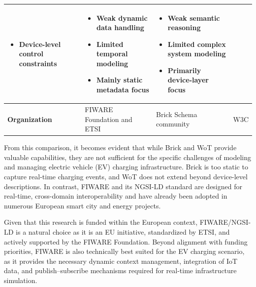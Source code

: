 \begin{table}[htb]
\begin{tabular}{|>{\raggedright\arraybackslash}p{2.8cm}|>{\raggedright\arraybackslash}p{4cm}|>{\raggedright\arraybackslash}p{4cm}|>{\raggedright\arraybackslash}p{4cm}|}
\begin{itemize}[leftmargin=*,nosep,after=\strut]
\item Device-level control constraints
\end{itemize} & 
\begin{itemize}[leftmargin=*,nosep,after=\strut]
\item Weak dynamic data handling
\item Limited temporal modeling
\item Mainly static metadata focus
\end{itemize} & 
\begin{itemize}[leftmargin=*,nosep,after=\strut]
\item Weak semantic reasoning
\item Limited complex system modeling
\item Primarily device-layer focus
\end{itemize} \\ 
\hline
\textbf{Organization} & 
FIWARE Foundation and ETSI & 
Brick Schema community & 
W3C \\ 
\hline
\end{tabular}
\end{table}

From this comparison, it becomes evident that while Brick and WoT
provide valuable capabilities, they are not sufficient for the specific
challenges of modeling and managing electric vehicle (EV) charging
infrastructure. Brick is too static to capture real-time charging events,
and WoT does not extend beyond device-level descriptions. In
contrast, FIWARE and its NGSI-LD standard are designed for
real-time, cross-domain interoperability and have already been
adopted in numerous European smart city and energy projects.

Given that this research is funded within the European context, FIWARE/NGSI-LD is a natural choice as it is an EU
initiative, standardized by ETSI, and actively supported by the FIWARE
Foundation. Beyond alignment with funding priorities, FIWARE is also
technically best suited for the EV charging scenario, as it provides the
necessary dynamic context management, integration of IoT data, and
publish–subscribe mechanisms required for real-time infrastructure
simulation.

